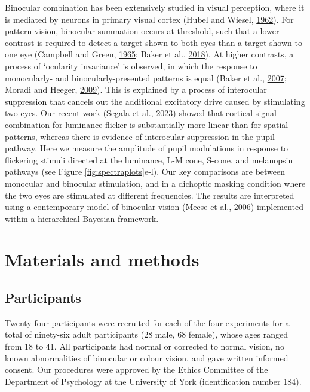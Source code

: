 \documentclass[
]{article}
\begin{document}
Binocular combination has been extensively studied in visual perception, where it is mediated by neurons in primary visual cortex (Hubel and Wiesel, \protect\hyperlink{ref-Hubel1962}{1962}). For pattern vision, binocular summation occurs at threshold, such that a lower contrast is required to detect a target shown to both eyes than a target shown to one eye (Campbell and Green, \protect\hyperlink{ref-Campbell1965}{1965}; Baker et al., \protect\hyperlink{ref-Baker2018}{2018}). At higher contrasts, a process of `ocularity invariance' is observed, in which the response to monocularly- and binocularly-presented patterns is equal (Baker et al., \protect\hyperlink{ref-Baker2007}{2007}; Moradi and Heeger, \protect\hyperlink{ref-Moradi2009}{2009}). This is explained by a process of interocular suppression that cancels out the additional excitatory drive caused by stimulating two eyes. Our recent work (Segala et al., \protect\hyperlink{ref-Segala2023}{2023}) showed that cortical signal combination for luminance flicker is substantially more linear than for spatial patterns, whereas there is evidence of interocular suppression in the pupil pathway. Here we measure the amplitude of pupil modulations in response to flickering stimuli directed at the luminance, L-M cone, S-cone, and melanopsin pathways (see Figure \ref{fig:spectraplots}e-l). Our key comparisons are between monocular and binocular stimulation, and in a dichoptic masking condition where the two eyes are stimulated at different frequencies. The results are interpreted using a contemporary model of binocular vision (Meese et al., \protect\hyperlink{ref-Meese2006}{2006}) implemented within a hierarchical Bayesian framework.

\hypertarget{materials-and-methods}{%
\section{Materials and methods}\label{materials-and-methods}}

\hypertarget{participants}{%
\subsection{Participants}\label{participants}}

Twenty-four participants were recruited for each of the four experiments for a total of ninety-six adult participants (28 male, 68 female), whose ages ranged from 18 to 41. All participants had normal or corrected to normal vision, no known abnormalities of binocular or colour vision, and gave written informed consent. Our procedures were approved by the Ethics Committee of the Department of Psychology at the University of York (identification number 184).
\end{document}
